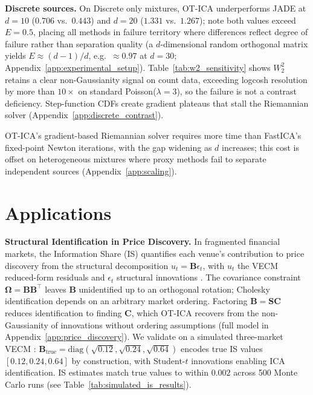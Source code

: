 \documentclass[accepted]{tpm2026} %
\begin{document}
\textbf{Discrete sources.} On Discrete only mixtures, OT-ICA underperforms JADE at $d = 10$ ($0.706$ vs.\ $0.443$) and $d = 20$ ($1.331$ vs.\ $1.267$); note both values exceed $E = 0.5$, placing all methods in failure territory where differences reflect degree of failure rather than separation quality (a $d$-dimensional random orthogonal matrix yields $E \approx (d-1)/d$, e.g.\ $\approx 0.97$ at $d=30$; Appendix~\ref{app:experimental_setup}). Table~\ref{tab:w2_sensitivity} shows $W_2^2$ retains a clear non-Gaussianity signal on count data, exceeding logcosh resolution by more than $10{\times}$ on standard Poisson($\lambda=3$), so the failure is not a contrast deficiency. Step-function CDFs create gradient plateaus that stall the Riemannian solver (Appendix~\ref{app:discrete_contrast}).


OT-ICA's gradient-based Riemannian solver requires more time than FastICA's fixed-point Newton iterations, with the gap widening as $d$ increases; 
this cost is offset on heterogeneous mixtures where proxy methods fail to separate independent sources  (Appendix~\ref{app:scaling}).

\section{ Applications}\label{sec:applications}

\textbf{Structural Identification in Price Discovery.}
In fragmented financial markets, the Information Share (IS) \citep{hasbrouck1995, baillie2002} quantifies each venue's contribution to price discovery from the structural decomposition $u_t = \mathbf{B}\epsilon_t$, with $u_t$ the VECM reduced-form residuals and $\epsilon_t$ structural innovations \citep{engle1987, johansen1991}. The covariance constraint $\boldsymbol{\Omega} = \mathbf{B}\mathbf{B}^\top$ leaves $\mathbf{B}$ unidentified up to an orthogonal rotation; Cholesky identification depends on an arbitrary market ordering. Factoring $\mathbf{B} = \mathbf{S}\mathbf{C}$ \citep{zema2025} reduces identification to finding $\mathbf{C}$, which OT-ICA recovers from the non-Gaussianity of innovations without ordering assumptions (full model in Appendix~\ref{app:price_discovery}).
We validate on a simulated three-market VECM \citep{zema2025}: $\mathbf{B}_\text{true} = \mathrm{diag}(\sqrt{0.12}, \sqrt{0.24}, \sqrt{0.64})$ encodes true IS values $[0.12, 0.24, 0.64]$ by construction, with Student-$t$ innovations enabling ICA identification.
IS estimates match true values to within $0.002$ across 500 Monte Carlo runs (see Table~\ref{tab:simulated_is_results}).
\end{document}
